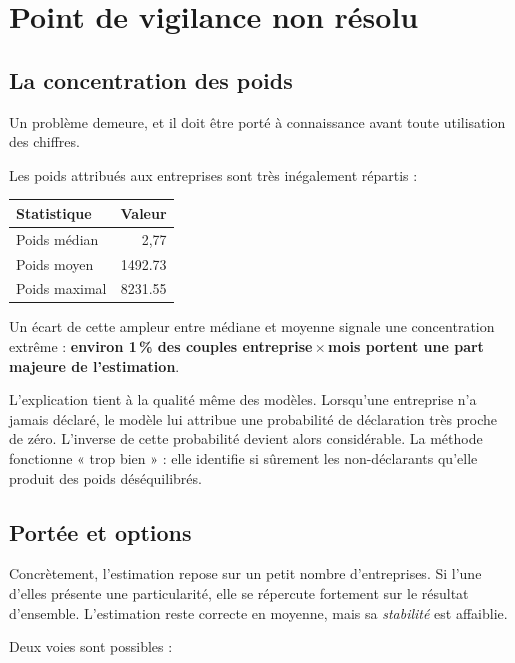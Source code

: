 \documentclass[11pt,a4paper]{article}
\begin{document}
\section{Point de vigilance non résolu}

\subsection{La concentration des poids}

Un problème demeure, et il doit être porté à connaissance avant toute
utilisation des chiffres.

Les poids attribués aux entreprises sont très inégalement répartis :

\begin{center}
\begin{tabular}{lr}
\toprule
\textbf{Statistique} & \textbf{Valeur} \\
\midrule
Poids médian & 2,77 \\
Poids moyen & \num{1492.73} \\
Poids maximal & \num{8231.55} \\
\bottomrule
\end{tabular}
\end{center}

Un écart de cette ampleur entre médiane et moyenne signale une
concentration extrême : \textbf{environ 1\,\% des couples
entreprise\,$\times$\,mois portent une part majeure de l'estimation}.

L'explication tient à la qualité même des modèles. Lorsqu'une entreprise
n'a jamais déclaré, le modèle lui attribue une probabilité de déclaration
très proche de zéro. L'inverse de cette probabilité devient alors
considérable. La méthode fonctionne « trop bien » : elle identifie si
sûrement les non-déclarants qu'elle produit des poids déséquilibrés.

\subsection{Portée et options}

Concrètement, l'estimation repose sur un petit nombre d'entreprises. Si
l'une d'elles présente une particularité, elle se répercute fortement sur
le résultat d'ensemble. L'estimation reste correcte en moyenne, mais sa
\emph{stabilité} est affaiblie.

Deux voies sont possibles :
\end{document}
